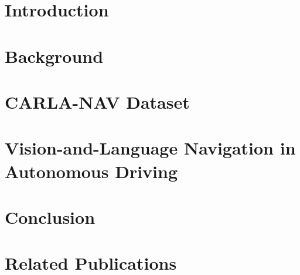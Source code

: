\documentclass[11pt]{book}
\begin{document}

\chapter{Introduction}
\label{ch:intro}



\chapter{Background}
\label{ch:background}



\chapter{CARLA-NAV Dataset}
\label{ch:dataset}



\chapter{Vision-and-Language Navigation in Autonomous Driving}
\label{ch:vln}



\chapter{Conclusion}
\label{ch:conc}


\chapter*{Related Publications}
\label{ch:relatedPubs}




 
\end{document}
